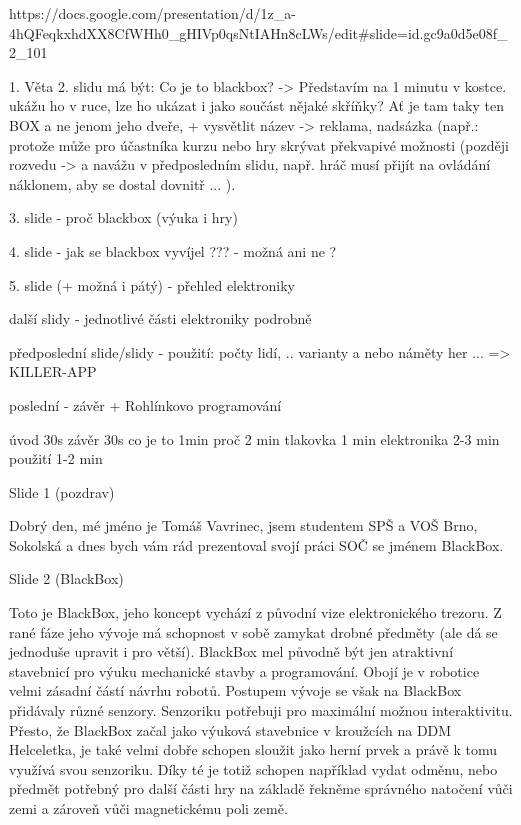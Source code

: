 https://docs.google.com/presentation/d/1z_a-4hQFeqkxhdXX8CfWHh0_gHIVp0qsNtIAHn8cLWs/edit#slide=id.gc9a0d5e08f_2_101

1. Věta 2. slidu má být: Co je to blackbox? -> Představím na 1 minutu v kostce.  
ukážu ho v ruce, lze ho ukázat i jako součást nějaké skříňky? Ať je tam taky ten BOX  
a ne jenom jeho dveře, 
+ vysvětlit název -> reklama, nadsázka (např.: protože může pro účastníka kurzu nebo 
hry skrývat překvapivé možnosti (později rozvedu -> a navážu v předposledním slidu, 
např. hráč musí přijít na ovládání náklonem, aby se dostal dovnitř ... ).


3. slide - proč blackbox (výuka i hry)

4. slide - jak se blackbox vyvíjel ??? - možná ani ne ? 

5. slide (+ možná i pátý) - přehled elektroniky 

další slidy - jednotlivé části elektroniky podrobně %


předposlední slide/slidy - použití: počty lidí, .. varianty a nebo náměty her ... => KILLER-APP

poslední - závěr + Rohlínkovo programování  

úvod 30s závěr 30s 
co je to 1min 
proč 2 min 
tlakovka 1 min 
elektronika 2-3 min 
použití 1-2 min 


Slide 1 (pozdrav)

Dobrý den, mé jméno je Tomáš Vavrinec, jsem studentem SPŠ a VOŠ Brno, Sokolská
a dnes bych vám rád prezentoval svojí práci SOČ se jménem BlackBox.



Slide 2 (BlackBox)

Toto je BlackBox, jeho koncept vychází z původní vize elektronického trezoru.
Z rané fáze jeho vývoje má schopnost v sobě zamykat drobné předměty (ale dá se jednoduše upravit i pro větší).
BlackBox mel původně být jen atraktivní stavebnicí pro výuku mechanické stavby a programování. Obojí je v robotice 
velmi zásadní částí návrhu robotů.
Postupem vývoje se však na BlackBox přidávaly různé senzory. 
Senzoriku potřebuji pro maximální možnou interaktivitu. Přesto, že BlackBox začal jako výuková stavebnice 
v kroužcích na DDM Helceletka, je také velmi dobře 
schopen sloužit jako herní prvek a právě k tomu využívá svou senzoriku. Díky té je totiž schopen například vydat odměnu, nebo
předmět potřebný pro další části hry na základě řekněme správného natočení vůči zemi a zároveň vůči magnetickému poli země.


